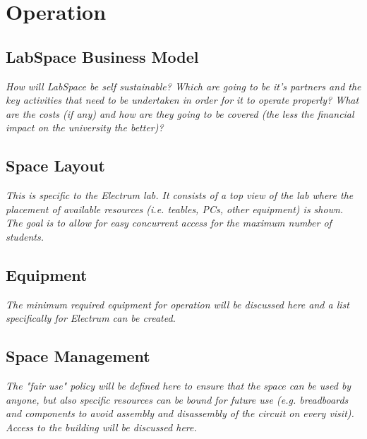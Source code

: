 \documentclass[a4paper, 11pt]{article}
\begin{document}
\section{Operation}

\subsection{LabSpace Business Model}
\textit{How will LabSpace be self sustainable? Which are going to be it's partners and the key activities that need to be undertaken in order for it to operate properly? What are the costs (if any) and how are they going to be covered (the less the financial impact on the university the better)?}

\subsection{Space Layout}
\textit{This is specific to the Electrum lab. It consists of a top view of the lab where the placement of available resources (i.e. teables, PCs, other equipment) is shown. The goal is  to allow for  easy concurrent access for the maximum number of students.}

\subsection{Equipment}
\textit{The minimum required equipment for operation will be discussed here and a list specifically for Electrum can be created.}

\subsection{Space Management}
\textit{The "fair use" policy will be defined here to ensure that the space can be used by anyone, but also specific resources can be bound for future use (e.g. breadboards and components to avoid assembly and disassembly of the circuit on every visit). Access to the building will be discussed here.}\cite{mobilehealth}

\newpage
\end{document}
